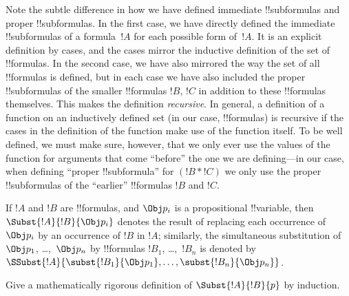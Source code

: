 \documentclass[../../../include/open-logic-section]{subfiles}
\begin{document}
\begin{explain}
Note the subtle difference in how we have defined immediate
!!{subformula}s and proper !!{subformula}s.  In the first case, we
have directly defined the immediate !!{subformula}s of a formula~$!A$
for each possible form of~$!A$.  It is an explicit definition by
cases, and the cases mirror the inductive definition of the set of
!!{formula}s.  In the second case, we have also mirrored the way the
set of all !!{formula}s is defined, but in each case we have also
included the proper !!{subformula}s of the smaller !!{formula}s $!B$,
$!C$ in addition to these !!{formula}s themselves.  This makes the
definition \emph{recursive}.  In general, a definition of a function
on an inductively defined set (in our case, !!{formula}s) is recursive
if the cases in the definition of the function make use of
the function itself. To be well defined, we must make sure, however,
that we only ever use the values of the function for arguments that
come ``before'' the one we are defining---in our case, when defining
``proper !!{subformula}'' for $(!B \ast !C)$ we only use the proper
!!{subformula}s of the ``earlier'' !!{formula}s $!B$ and $!C$.
\end{explain}



\begin{defn}
If $!A$ and $!B$ are !!{formula}s, and $\Obj p_i$ is a propositional
!!{variable}, then $\Subst{!A}{!B}{\Obj p_i}$ denotes the result of
replacing each occurrence of $\Obj p_i$ by an occurrence of $!B$ in $!A$;
similarly, the simultaneous substitution of $\Obj p_1$, \dots,~$\Obj p_n$ by
!!{formula}s $!B_1$, \dots,~$!B_n$ is denoted by
$\SSubst{!A}{\subst{!B_1}{\Obj p_1},\dots,\subst{!B_n}{\Obj p_n}}$.
\end{defn}

\begin{prob}
Give a mathematically rigorous definition of $\Subst{!A}{!B}{p}$ by
induction.
\end{prob}
\end{document}

